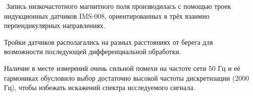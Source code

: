 
	 Запись низкочастотного магнитного поля производилась с
	помощью троек индукционных датчиков IMS-008,
	ориентированных в трёх взаимно перпендикулярных
	направлениях. 

	Тройки датчиков располагались на разных
	расстояниях от берега для возможности последующей
	дифференциальной обработки.

	Наличие в месте измерений 	очень сильной помехи на частоте сети 50 Гц и её гармониках 	обусловило выбор достаточно высокой частоты 	дискретизации (2000 Гц), чтобы избежать искажений спектра 	исследуемого сигнала.